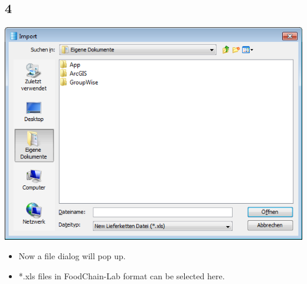 \documentclass{beamer}
\begin{document}
\subsection{4}
\begin{frame}
	\begin{center}
  		\includegraphics[height=0.6\textheight]{4.png}
	\end{center}
	\begin{itemize}
		\item Now a file dialog will pop up.
		\item *.xls files in FoodChain-Lab format can be selected here.
	\end{itemize}
\end{frame}
\end{document}
